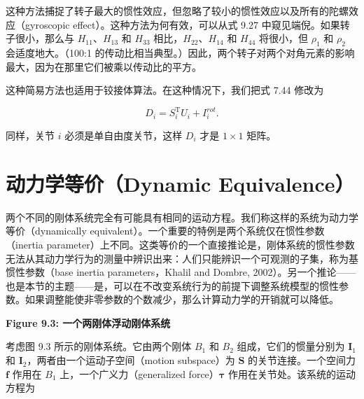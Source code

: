 \documentclass[10pt,a4paper]{book}
\theoremstyle{thmstyle} %
\theoremstyle{defstyle} %
\theoremstyle{prostyle} %
\begin{document}
这种方法捕捉了转子最大的惯性效应，但忽略了较小的惯性效应以及所有的陀螺效应（gyroscopic effect）。这种方法为何有效，可以从式 9.27 中窥见端倪。如果转子很小，那么与 $H_{11}$、$H_{13}$ 和 $H_{33}$ 相比，$H_{22}$、$H_{14}$ 和 $H_{44}$ 将很小，但 $\rho_{1}$ 和 $\rho_{2}$ 会适度地大。（100:1 的传动比相当典型。）因此，两个转子对两个对角元素的影响最大，因为在那里它们被乘以传动比的平方。



这种简易方法也适用于铰接体算法。在这种情况下，我们把式 7.44 修改为



$$
D _ { i } = S _ { i } ^{\mathrm { T} } U _ { i } + I _ { i } ^{r o t} .
$$



同样，关节 $i$ 必须是单自由度关节，这样 $D_i$ 才是 $1 \times 1$ 矩阵。



\section{动力学等价（Dynamic Equivalence）}





两个不同的刚体系统完全有可能具有相同的运动方程。我们称这样的系统为动力学等价（dynamically equivalent）。一个重要的特例是两个系统仅在惯性参数（inertia parameter）上不同。这类等价的一个直接推论是，刚体系统的惯性参数无法从其动力学行为的测量中辨识出来：人们只能辨识一个可观测的子集，称为基惯性参数（base inertia parameters，Khalil and Dombre, 2002）。另一个推论——也是本节的主题——是，可以在不改变系统行为的前提下调整系统模型的惯性参数。如果调整能使非零参数的个数减少，那么计算动力学的开销就可以降低。



\noindent\textbf{Figure 9.3: 一个两刚体浮动刚体系统}





考虑图 9.3 所示的刚体系统。它由两个刚体 $B_{1}$ 和 $B_{2}$ 组成，它们的惯量分别为 $\boldsymbol{I}_{1}$ 和 $\boldsymbol{I}_{2}$，两者由一个运动子空间（motion subspace）为 $\boldsymbol{S}$ 的关节连接。一个空间力 $\boldsymbol{f}$ 作用在 $B_{1}$ 上，一个广义力（generalized force）$\boldsymbol{\tau}$ 作用在关节处。该系统的运动方程为
\end{document}
